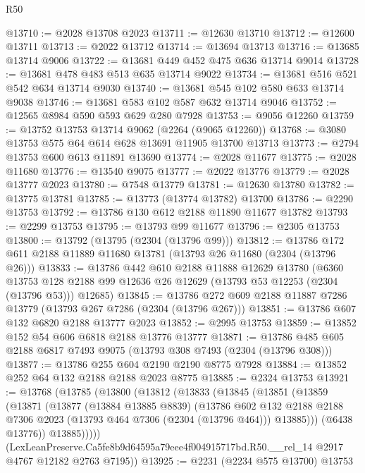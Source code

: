 \begin{lexlean}{R50}
\begin{coremodule}
@13710 := @2028 @13708 @2023
@13711 := @12630 @13710
@13712 := @12600 @13711
@13713 := @2022 @13712
@13714 := @13694 @13713
@13716 := @13685 @13714 @9006
@13722 := @13681 @449 @452 @475 @636 @13714 @9014
@13728 := @13681 @478 @483 @513 @635 @13714 @9022
@13734 := @13681 @516 @521 @542 @634 @13714 @9030
@13740 := @13681 @545 @102 @580 @633 @13714 @9038
@13746 := @13681 @583 @102 @587 @632 @13714 @9046
@13752 := @12565 @8984 @590 @593 @629 @280 @7928
@13753 := @9056 @12260
@13759 := @13752 @13753 @13714 @9062 (@2264 (@9065 @12260))
@13768 := @3080 @13753 @575 @64 @614 @628 @13691 @11905 @13700 @13713
@13773 := @2794 @13753 @600 @613 @11891 @13690
@13774 := @2028 @11677
@13775 := @2028 @11680
@13776 := @13540 @9075
@13777 := @2022 @13776
@13779 := @2028 @13777 @2023
@13780 := @7548 @13779
@13781 := @12630 @13780
@13782 := @13775 @13781
@13785 := @13773 (@13774 @13782) @13700
@13786 := @2290 @13753
@13792 := @13786 @130 @612 @2188 @11890 @11677 @13782
@13793 := @2299 @13753
@13795 := @13793 @99 @11677
@13796 := @2305 @13753
@13800 := @13792 (@13795 (@2304 (@13796 @99)))
@13812 := @13786 @172 @611 @2188 @11889 @11680 @13781 (@13793 @26 @11680 (@2304 (@13796 @26)))
@13833 := @13786
    @442
    @610
    @2188
    @11888
    @12629
    @13780
    (@6360 @13753 @128 @2188 @99 @12636 @26 @12629 (@13793 @53 @12253 (@2304 (@13796 @53))) @12685)
@13845 := @13786 @272 @609 @2188 @11887 @7286 @13779 (@13793 @267 @7286 (@2304 (@13796 @267)))
@13851 := @13786 @607 @132 @6820 @2188 @13777 @2023
@13852 := @2995 @13753
@13859 := @13852 @152 @54 @606 @6818 @2188 @13776 @13777
@13871 := @13786 @485 @605 @2188 @6817 @7493 @9075 (@13793 @308 @7493 (@2304 (@13796 @308)))
@13877 := @13786 @255 @604 @2190 @2190 @8775 @7928
@13884 := @13852 @252 @64 @132 @2188 @2188 @2023 @8775
@13885 := @2324 @13753
@13921 := @13768
    (@13785
      (@13800
        (@13812
          (@13833
            (@13845
              (@13851
                (@13859
                  (@13871
                    (@13877
                      (@13884 @13885 @8839)
                      (@13786
                        @602
                        @132
                        @2188
                        @2188
                        @7306
                        @2023
                        (@13793 @464 @7306 (@2304 (@13796 @464)))
                        @13885)))
                  (@6438 @13776))
                @13885)))))
      (LexLeanPreserve.Ca5fe8b9d64595a79eee4f004915717bd.R50.__rel_14
        @2917
        @4767
        @12182
        @2763
        @7195))
@13925 := @2231 (@2234 @575 @13700) @13753

\end{coremodule}
\end{lexlean}
